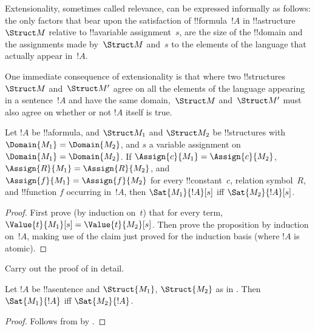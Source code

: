 \documentclass[../../../include/open-logic-section]{subfiles}
\begin{document}

\begin{explain}
Extensionality, sometimes called relevance, can be expressed
informally as follows: the only factors that bear upon the
satisfaction of !!{formula}~$!A$ in !!a{structure}~$\Struct M$
relative to !!a{variable} assignment~$s$, are the size of the
!!{domain} and the assignments made by~$\Struct M$ and~$s$ to the
elements of the language that actually appear in~$!A$.

One immediate consequence of extensionality is that where two
!!{structure}s~$\Struct M$ and~$\Struct M'$ agree on all the elements
of the language appearing in a sentence~$!A$ and have the same
domain,~$\Struct M$ and~$\Struct M'$ must also agree on whether or not
$!A$ itself is true.
\end{explain}

\begin{prop}[Extensionality]
  Let $!A$ be !!a{formula}, and $\Struct M_1$ and $\Struct M_2$ be
  !!{structure}s with $\Domain{M_1} = \Domain{M_2}$, and $s$ a
  variable assignment on $\Domain{M_1} = \Domain{M_2}$.  If
  $\Assign{c}{M_1} = \Assign{c}{M_2}$, $\Assign{R}{M_1}=\Assign{R}{M_2}$,
  and $\Assign{f}{M_1} = \Assign{f}{M_2}$ for every !!{constant}~$c$,
  relation symbol~$R$, and !!{function} $f$ occurring in~$!A$, then
  $\Sat{M_1}{!A}[s]$ iff $\Sat{M_2}{!A}[s]$.
\end{prop}

\begin{proof}
  First prove (by induction on~$t$) that for every term,
  $\Value{t}{M_1}[s] = \Value{t}{M_2}[s]$.  Then prove the proposition
  by induction on~$!A$, making use of the claim just proved for the
  induction basis (where $!A$ is atomic).
\end{proof}

\begin{prob}
Carry out the proof of  in
detail.
\end{prob}

\begin{cor}
  Let $!A$ be !!a{sentence} and $\Struct{M_1}$, $\Struct{M_2}$ as in
  . Then $\Sat{M_1}{!A}$ iff $\Sat{M_2}{!A}$.
\end{cor}

\begin{proof}
Follows from  by .
\end{proof}
\end{document}
